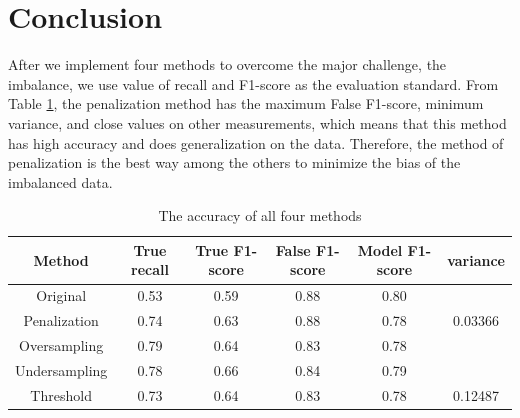 \documentclass{article}
\begin{document}
\section{Conclusion}
After we implement four methods to overcome the major challenge, the imbalance, we use value of recall and F1-score as the evaluation standard. From Table  \ref{all}, the penalization method has the maximum False F1-score, minimum variance, and close values on other measurements, which means that this method has high accuracy and does generalization on the data. Therefore, the method of penalization is the best way among the others to minimize the bias of the imbalanced data. 
\FloatBarrier
\begin{table}[htb]
\centering
\caption{The accuracy of all four methods}
	\begin{tabular}{||c c c c c c||} 
	 \hline
 	Method & True recall & True F1-score  & False F1-score & Model F1-score & variance\\ [0.5ex] 
 	\hline\hline
 	Original & 0.53 & 0.59 & 0.88 & 0.80 &  \\ 
 	Penalization & 0.74 & 0.63 & 0.88 & 0.78 & 0.03366\\
   	Oversampling & 0.79 & 0.64 & 0.83 & 0.78 & \\
   	Undersampling & 0.78 & 0.66 & 0.84 & 0.79 & \\
   	Threshold & 0.73 & 0.64 & 0.83 & 0.78 & 0.12487\\
 	\hline
	\end{tabular}
\label{all}
\end{table}
\FloatBarrier
\end{document}
